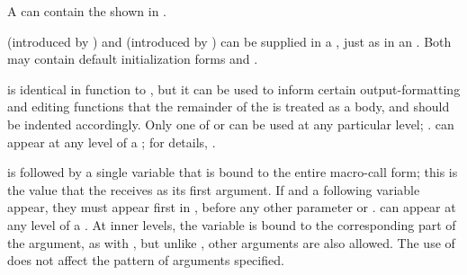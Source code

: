 A  can contain the  shown
in \thenextfigure.


 (introduced by ) and
 (introduced by )
can be supplied in a ,
just as in an .
Both may contain default initialization forms and .
 
 is identical in function to ,
but it can be used to inform certain output-formatting 
and editing functions that the remainder of the  is
treated as a body, and should be indented accordingly.
Only one of  or  can be used at any particular level; 
\seesection\DestructuringOfLambdaLists.
 can appear at any level of a 
; 
for details, \seesection\DestructuringOfLambdaLists.
 
 is followed by a single variable that is bound to the
entire macro-call form; this is the value that the 
receives as its first argument.
If  and a following variable appear,
they must appear first in ,
before any other parameter or .
 can appear at any level of a . 
At inner levels, the  variable is bound to
		the corresponding part of the argument, 
as with , but unlike , other arguments are also allowed.
The use of  does not affect the pattern of arguments
     specified.

